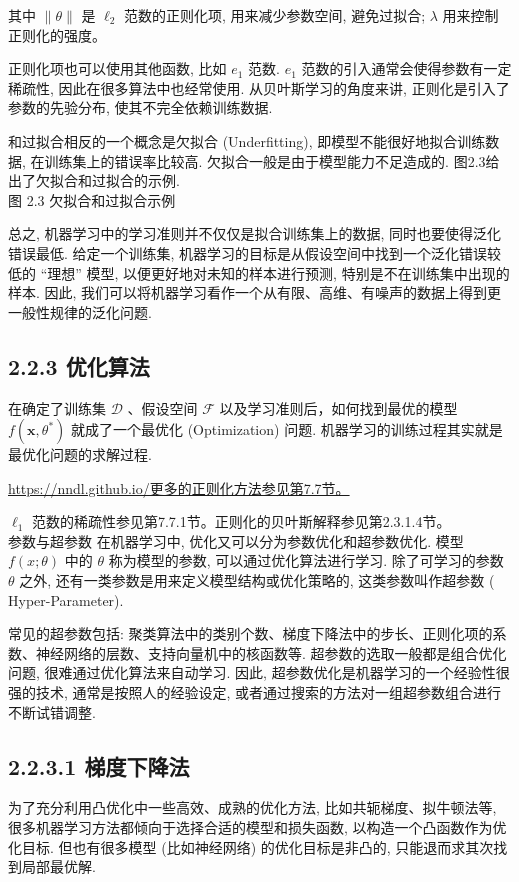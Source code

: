 \documentclass[10pt]{article}
\begin{document}
其中 $\|\theta\|$ 是 $\ell_{2}$ 范数的正则化项, 用来减少参数空间, 避免过拟合; $\lambda$ 用来控制正则化的强度。

正则化项也可以使用其他函数, 比如 $e_{1}$ 范数. $e_{1}$ 范数的引入通常会使得参数有一定稀疏性, 因此在很多算法中也经常使用. 从贝叶斯学习的角度来讲, 正则化是引入了参数的先验分布, 使其不完全依赖训练数据.

和过拟合相反的一个概念是欠拟合 (Underfitting), 即模型不能很好地拟合训练数据, 在训练集上的错误率比较高. 欠拟合一般是由于模型能力不足造成的. 图2.3给出了欠拟合和过拟合的示例.\\


图 2.3 欠拟合和过拟合示例

总之, 机器学习中的学习准则并不仅仅是拟合训练集上的数据, 同时也要使得泛化错误最低. 给定一个训练集, 机器学习的目标是从假设空间中找到一个泛化错误较低的 “理想” 模型, 以便更好地对未知的样本进行预测, 特别是不在训练集中出现的样本. 因此, 我们可以将机器学习看作一个从有限、高维、有噪声的数据上得到更一般性规律的泛化问题.

\subsection*{2.2.3 优化算法}
在确定了训练集 $\mathcal{D}$ 、假设空间 $\mathcal{F}$ 以及学习准则后，如何找到最优的模型 $f\left(\boldsymbol{x}, \theta^{*}\right)$ 就成了一个最优化 (Optimization) 问题. 机器学习的训练过程其实就是最优化问题的求解过程.

\href{https://nndl.github.io/%E6%9B%B4%E5%A4%9A%E7%9A%84%E6%AD%A3%E5%88%99%E5%8C%96%E6%96%B9%E6%B3%95%E5%8F%82%E8%A7%81%E7%AC%AC7.7%E8%8A%82%E3%80%82}{https://nndl.github.io/更多的正则化方法参见第7.7节。}

$\ell_{1}$ 范数的稀疏性参见第7.7.1节。正则化的贝叶斯解释参见第2.3.1.4节。\\
参数与超参数 在机器学习中, 优化又可以分为参数优化和超参数优化. 模型 $f(x ; \theta)$ 中的 $\theta$ 称为模型的参数, 可以通过优化算法进行学习. 除了可学习的参数 $\theta$ 之外, 还有一类参数是用来定义模型结构或优化策略的, 这类参数叫作超参数 ( Hyper-Parameter).

常见的超参数包括: 聚类算法中的类别个数、梯度下降法中的步长、正则化项的系数、神经网络的层数、支持向量机中的核函数等. 超参数的选取一般都是组合优化问题, 很难通过优化算法来自动学习. 因此, 超参数优化是机器学习的一个经验性很强的技术, 通常是按照人的经验设定, 或者通过搜索的方法对一组超参数组合进行不断试错调整.

\subsection*{2.2.3.1 梯度下降法}
为了充分利用凸优化中一些高效、成熟的优化方法, 比如共轭梯度、拟牛顿法等, 很多机器学习方法都倾向于选择合适的模型和损失函数, 以构造一个凸函数作为优化目标. 但也有很多模型 (比如神经网络) 的优化目标是非凸的, 只能退而求其次找到局部最优解.
\end{document}
